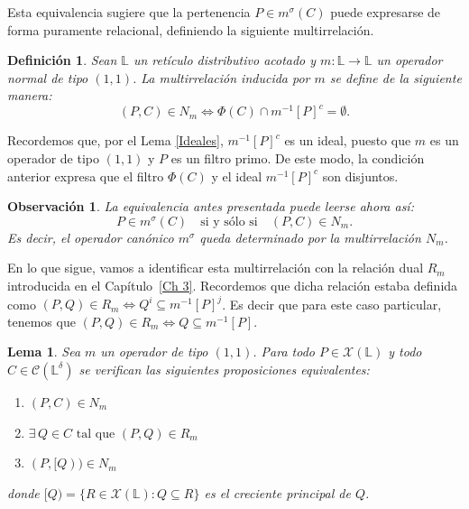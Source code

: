 \documentclass[12pt]{book}
\newtheorem{lemma}[theorem]{Lema}
\newtheorem{definition}[theorem]{Definición}
\newtheorem{remark}[theorem]{Observación}
\begin{document}
Esta equivalencia sugiere que la pertenencia
$P\in m^\sigma(C)$ puede expresarse de forma puramente relacional,
definiendo la siguiente multirrelación.

\begin{definition}
\label{def:multirrelacion-inducida-(1,1)}
Sean $\mathbb{L}$ un retículo distributivo acotado y $m : \mathbb{L} \to \mathbb{L}$ un operador normal de tipo $(1,1)$. La \emph{multirrelación inducida por $m$} se define de la siguiente manera:
\[
(P,C) \in N_m 
\iff 
\Phi(C) \cap m^{-1}[P]^c = \emptyset.
\]
\end{definition}

Recordemos que, por el Lema \ref{Ideales}, $m^{-1}[P]^c$ es un ideal, puesto que $m$ es un operador de tipo $(1,1)$ y $P$ es un filtro primo. De este modo, la condición anterior
expresa que el filtro $\Phi(C)$ y el ideal $m^{-1}[P]^c$ son disjuntos.

\begin{remark}\label{Obs:multi-msigma}
La equivalencia antes presentada puede leerse ahora así:
\[
P\in m^\sigma(C)
\quad\text{si y sólo si}\quad
(P,C)\in N_m.
\]
Es decir, el operador canónico $m^\sigma$ queda determinado por la multirrelación $N_m$.
\end{remark}
En lo que sigue, vamos a identificar esta multirrelación con la relación dual $R_m$ introducida en el Capítulo~\ref{Ch 3}. Recordemos que dicha relación estaba definida como $(P,Q)\in R_m\iff Q^i\subseteq m^{-1}[P]^j$. Es decir que para este caso particular, tenemos que  $(P,Q)\in R_m\iff Q\subseteq m^{-1}[P]$.

\begin{lemma}\label{lem:N-R}
Sea \(m\) un operador de tipo \((1,1)\). 
Para todo \(P\in\mathcal{X}(\mathbb L)\) y todo \(C\in\mathcal C(\mathbb L^\delta)\) se verifican las siguientes proposiciones equivalentes:
\begin{enumerate}
    \item $(P,C)\in N_m$
    \item $\exists\, Q\in C \text{ tal que } (P,Q)\in R_m$
    \item $(P,[Q))\in N_m$
\end{enumerate}
donde \([Q)=\{R\in \mathcal{X}(\mathbb L): Q\subseteq R\}\) es el creciente principal de \(Q\).
\end{lemma}
\end{document}

